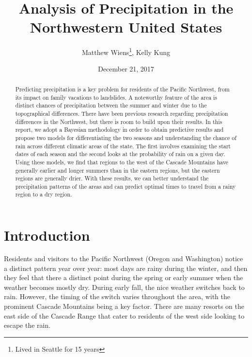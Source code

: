 \documentclass{article}
\begin{document}
\title{Analysis of Precipitation in the Northwestern United States}
\author{Matthew Wiens\footnote{Lived in Seattle for 15 years}, Kelly Kung}
\date{December 21, 2017}
\maketitle
\begin{abstract}

Predicting precipitation is a key problem for residents of the Pacific Northwest, from its impact on family vacations to landslides. A noteworthy feature of the area is distinct chances of precipitation between the summer and winter due to the topographical differences. There have been previous research regarding precipitation differences in the Northwest, but there is room to build upon their results. In this report, we adopt a Bayesian methodology in order to obtain predictive results and propose two models for differentiating the two seasons and understanding the chance of rain across different climatic areas of the state. The first involves examining the start dates of each season and the second looks at the probability of rain on a given day. Using these models, we find that regions to the west of the Cascade Mountains have generally earlier and longer summers than in the eastern regions, but the eastern regions are generally drier. With these results, we can better understand the precipitation patterns of the areas and can predict optimal times to travel from a rainy region to a dry region. 

\end{abstract}

\section{Introduction}

Residents and visitors to the Pacific Northwest (Oregon and Washington) notice a distinct pattern year over year: most days are rainy during the winter, and then they feel that there a distinct point during the spring or early summer when the weather becomes mostly dry. During early fall, the nice weather switches back to rain.  However, the timing of the switch varies throughout the area, with the prominent Cascade Mountains being a key factor. There are many resorts on the east side of the Cascade Range that cater to residents of the west side looking to escape the rain. 
\end{document}

